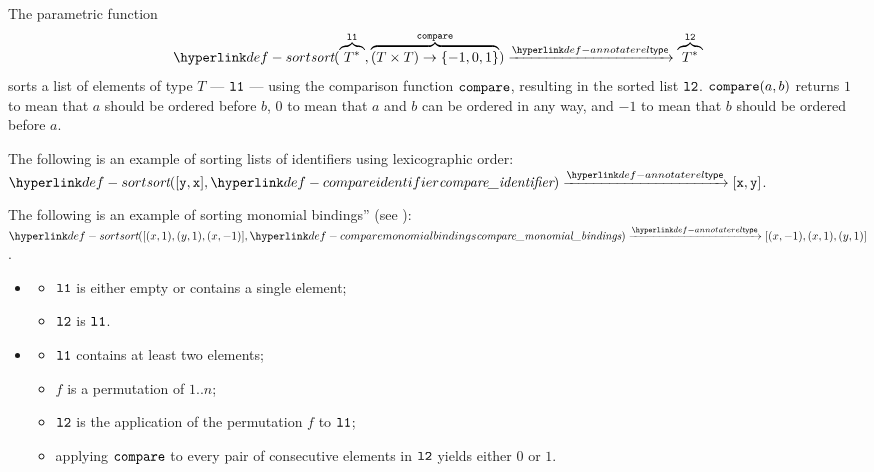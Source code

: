 \FormallyParagraph
\begin{mathpar}
\end{mathpar}

\begin{mathpar}
\end{mathpar}

\hypertarget{def-sort}{}
The parametric function
\[
\sort(\overname{T^*}{\vlone}, \overname{(T\times T)\rightarrow \{-1,0,1\}}{\compare}) \typearrow \overname{T^*}{\vltwo}
\]
sorts a list of elements of type $T$ --- $\vlone$ --- using the comparison function $\compare$,
resulting in the sorted list $\vltwo$.
$\compare(a, b)$ returns $1$ to mean that $a$ should be ordered before $b$,
$0$ to mean that $a$ and $b$ can be ordered in any way,
and $-1$ to mean that $b$ should be ordered before $a$.

The following is an example of sorting lists of identifiers using lexicographic order:\\
$\sort([\vy, \vx], \compareidentifier) \typearrow [\vx, \vy]$.

The following is an example of sorting monomial bindings''
(see ):\\
$\sort([(x, 1), (y, 1), (x, -1)], \comparemonomialbindings) \typearrow [(x, -1), (x, 1), (y, 1)]$.

\ProseParagraph
\OneApplies
\begin{itemize}
  \item {}
  \begin{itemize}
    \item $\vlone$ is either empty or contains a single element;
    \item $\vltwo$ is $\vlone$.
  \end{itemize}

  \item {}
  \begin{itemize}
    \item $\vlone$ contains at least two elements;
    \item $f$ is a permutation of $1..n$;
    \item $\vltwo$ is the application of the permutation $f$ to $\vlone$;
    \item applying $\compare$ to every pair of consecutive elements in $\vltwo$ yields either $0$ or $1$.
  \end{itemize}
\end{itemize}

